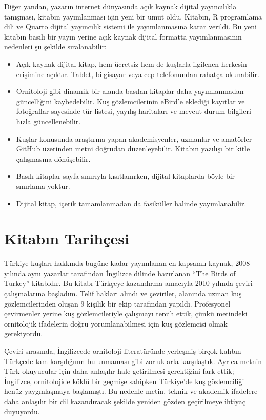 \documentclass[
  a4paper,
  DIV=11,
  numbers=noendperiod]{scrreprt}
\begin{document}

Diğer yandan, yazarın internet dünyasında açık kaynak dijital
yayıncılıkla tanışması, kitabın yayımlanması için yeni bir umut oldu.
Kitabın, R programlama dili ve Quarto dijital yayıncılık sistemi ile
yayımlanmasına karar verildi. Bu yeni kitabın basılı bir yayın yerine
açık kaynak dijital formatta yayımlanmasının nedenleri şu şekilde
sıralanabilir:

\begin{itemize}
\item
  Açık kaynak dijital kitap, hem ücretsiz hem de kuşlarla ilgilenen
  herkesin erişimine açıktır. Tablet, bilgisayar veya cep telefonundan
  rahatça okunabilir.
\item
  Ornitoloji gibi dinamik bir alanda basılan kitaplar daha yayımlanmadan
  güncelliğini kaybedebilir. Kuş gözlemcilerinin eBird'e eklediği
  kayıtlar ve fotoğraflar sayesinde tür listesi, yayılış haritaları ve
  mevcut durum bilgileri hızla güncellenebilir.
\item
  Kuşlar konusunda araştırma yapan akademisyenler, uzmanlar ve amatörler
  GitHub üzerinden metni doğrudan düzenleyebilir. Kitabın yazılışı bir
  kitle çalışmasına dönüşebilir.
\item
  Basılı kitaplar sayfa sınırıyla kısıtlanırken, dijital kitaplarda
  böyle bir sınırlama yoktur.
\item
  Dijital kitap, içerik tamamlanmadan da fasiküller halinde
  yayımlanabilir.
\end{itemize}

\section*{Kitabın Tarihçesi}\label{kitabux131n-tarihuxe7esi}


Türkiye kuşları hakkında bugüne kadar yayımlanan en kapsamlı kaynak,
2008 yılında aynı yazarlar tarafından İngilizce dilinde hazırlanan ``The
Birds of Turkey'' kitabıdır. Bu kitabı Türkçeye kazandırma amacıyla 2010
yılında çeviri çalışmalarına başladım. Telif hakları alındı ve
çeviriler, alanında uzman kuş gözlemcilerinden oluşan 9 kişilik bir ekip
tarafından yapıldı. Profesyonel çevirmenler yerine kuş gözlemcileriyle
çalışmayı tercih ettik, çünkü metindeki ornitolojik ifadelerin doğru
yorumlanabilmesi için kuş gözlemcisi olmak gerekiyordu.

Çeviri sırasında, İngilizcede ornitoloji literatüründe yerleşmiş birçok
kalıbın Türkçede tam karşılığının bulunmaması gibi zorluklarla
karşılaştık. Ayrıca metnin Türk okuyucular için daha anlaşılır hale
getirilmesi gerektiğini fark ettik; İngilizce, ornitolojide köklü bir
geçmişe sahipken Türkiye'de kuş gözlemciliği henüz yaygınlaşmaya
başlamıştı. Bu nedenle metin, teknik ve akademik ifadelere daha
anlaşılır bir dil kazandıracak şekilde yeniden gözden geçirilmeye
ihtiyaç duyuyordu.
\end{document}
